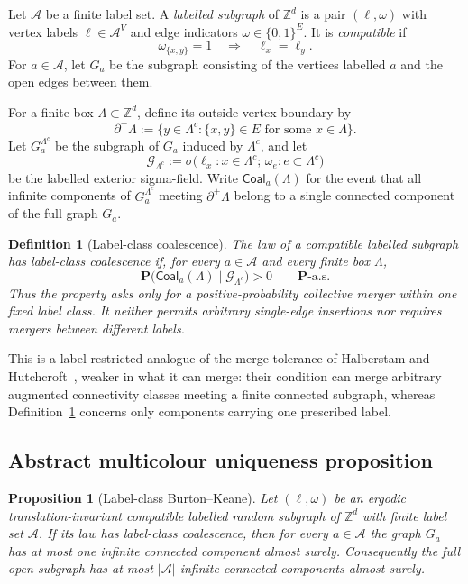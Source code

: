 \documentclass[11pt]{article}
\newtheorem{proposition}[theorem]{Proposition}
\newtheorem{definition}[theorem]{Definition}
\numberwithin{theorem}{section}
\theoremstyle{remark}
\begin{document}
Let $\mathcal{A}$ be a finite label set.
A \emph{labelled subgraph} of $\mathbb{Z}^d$ is a pair $(\ell,\omega)$ with vertex labels $\ell\in\mathcal{A}^V$ and edge indicators $\omega\in\{0,1\}^E$.
It is \emph{compatible} if
\[
  \omega_{\{x,y\}}=1 \quad\Longrightarrow\quad \ell_x=\ell_y.
\]
For $a\in\mathcal{A}$, let $G_a$ be the subgraph consisting of the vertices labelled $a$ and the open edges between them.

For a finite box $\Lambda\subset\mathbb{Z}^d$, define its outside vertex boundary by
\[
  \partial^+\Lambda
  :=\bigl\{y\in\Lambda^c: \{x,y\}\in E
        \text{ for some }x\in\Lambda\bigr\}.
\]
Let $G_a^{\Lambda^c}$ be the subgraph of $G_a$ induced by $\Lambda^c$, and let
\[
  \mathscr{G}_{\Lambda^c}
  :=\sigma\bigl(\ell_x:x\in\Lambda^c;\,
                 \omega_e:e\subset\Lambda^c\bigr)
\]
be the labelled exterior sigma-field.
Write $\mathsf{Coal}_a(\Lambda)$ for the event that all infinite components of $G_a^{\Lambda^c}$ meeting $\partial^+\Lambda$ belong to a single connected component of the full graph $G_a$.

\begin{definition}[Label-class coalescence]\label{def:label-coalescence}
The law of a compatible labelled subgraph has \emph{label-class coalescence} if, for every $a\in\mathcal{A}$ and every finite box $\Lambda$,
\[
  \mathbf{P}\bigl(\mathsf{Coal}_a(\Lambda)
       \mid\mathscr{G}_{\Lambda^c}\bigr)>0
  \qquad \mathbf{P}\text{-a.s.}
\]
Thus the property asks only for a positive-probability collective merger within one fixed label class.
It neither permits arbitrary single-edge insertions nor requires mergers between different labels.
\end{definition}

This is a label-restricted analogue of the merge tolerance of Halberstam and Hutchcroft~\cite[Lemma~3.4]{HH2023}, weaker in what it can merge: their condition can merge arbitrary augmented connectivity classes meeting a finite connected subgraph, whereas Definition~\ref{def:label-coalescence} concerns only components carrying one prescribed label.

\subsection{Abstract multicolour uniqueness proposition}\label{sec:abstract-bk}

\begin{proposition}[Label-class Burton--Keane]\label{prop:label-bk}
Let $(\ell,\omega)$ be an ergodic translation-invariant compatible labelled random subgraph of $\mathbb{Z}^d$ with finite label set $\mathcal{A}$.
If its law has label-class coalescence, then for every $a\in\mathcal{A}$ the graph $G_a$ has at most one infinite connected component almost surely.
Consequently the full open subgraph has at most $|\mathcal{A}|$ infinite connected components almost surely.
\end{proposition}
\end{document}
